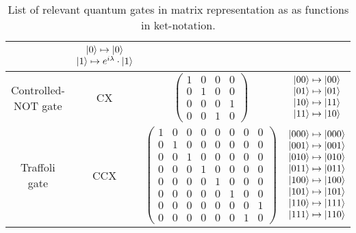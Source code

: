 \begin{table}[htp]
\begin{tabular}{c|c|cc}
                                    & $\begin{matrix} \ket{0} \mapsto \ket{0} \\ \ket{1} \mapsto e^{i\lambda} \cdot \ket{1} \end{matrix}$             \\ \hline
    Controlled-NOT gate          & CX     
                                    & $\begin{pmatrix} 1 & 0 & 0 & 0\\ 0 & 1 & 0 & 0\\ 0 & 0 & 0 & 1\\ 0 & 0 & 1 & 0 \end{pmatrix}$       
                                    & $\begin{matrix} \ket{00} \mapsto \ket{00} \\ \ket{01} \mapsto \ket{01} \\ \ket{10} \mapsto \ket{11} \\ \ket{11} \mapsto \ket{10} \end{matrix}$\\ \hline
    Traffoli gate                & CCX     
                                    & $\begin{pmatrix} 1 & 0 & 0 & 0 & 0 & 0 & 0 & 0 \\ 0 & 1 & 0 & 0 & 0 & 0 & 0 & 0 \\ 0 & 0 & 1 & 0 & 0 & 0 & 0 & 0 \\ 0 & 0 & 0 & 1 & 0 & 0 & 0 & 0 \\ 0 & 0 & 0 & 0 & 1 & 0 & 0 & 0 \\ 0 & 0 & 0 & 0 & 0 & 1 & 0 & 0 \\ 0 & 0 & 0 & 0 & 0 & 0 & 0 & 1 \\ 0 & 0 & 0 & 0 & 0 & 0 & 1 & 0 \end{pmatrix}$       
                                    & $\begin{matrix} \ket{000} \mapsto \ket{000} \\ \ket{001} \mapsto \ket{001} \\ \ket{010} \mapsto \ket{010} \\ \ket{011} \mapsto \ket{011} \\  \ket{100} \mapsto \ket{100} \\ \ket{101} \mapsto \ket{101} \\ \ket{110} \mapsto \ket{111} \\ \ket{111} \mapsto \ket{110} \end{matrix}$            
    \end{tabular}
    \caption{List of relevant quantum gates in matrix representation as as functions in ket-notation.}
    \label{tab:gates}
\end{table}

